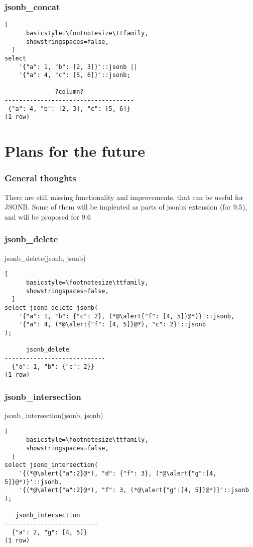 \documentclass[14pt, compress]{beamer}
\begin{document}
\begin{frame}[fragile]
\frametitle{jsonb\_concat}
  \begin{lstlisting}[
      basicstyle=\footnotesize\ttfamily,
      showstringspaces=false,
  ]
select 
    '{"a": 1, "b": [2, 3]}'::jsonb ||
    '{"a": 4, "c": [5, 6]}'::jsonb;

              ?column?              
------------------------------------
 {"a": 4, "b": [2, 3], "c": [5, 6]}
(1 row)

  \end{lstlisting}
\end{frame}

\section{Plans for the future}

\begin{frame}[fragile]
  \frametitle{General thoughts}

  There are still missing functionality and improvements, that can be useful for JSONB.
  Some of them will be implented as parts of jsonbx extension (for 9.5), and will be proposed for 9.6
\end{frame}

\begin{frame}[fragile]
  \frametitle{jsonb\_delete}
  jsonb\_delete(jsonb, jsonb)

  \begin{lstlisting}[
      basicstyle=\footnotesize\ttfamily,
      showstringspaces=false,
  ]
select jsonb_delete_jsonb(
    '{"a": 1, "b": {"c": 2}, (*@\alert{"f": [4, 5]}@*)}'::jsonb,
    '{"a": 4, (*@\alert{"f": [4, 5]}@*), "c": 2}'::jsonb
);

      jsonb_delete
----------------------------
  {"a": 1, "b": {"c": 2}}
(1 row)

  \end{lstlisting}

\end{frame}

\begin{frame}[fragile]
  \frametitle{jsonb\_intersection}
  jsonb\_intersection(jsonb, jsonb)

  \begin{lstlisting}[
      basicstyle=\footnotesize\ttfamily,
      showstringspaces=false,
  ]
select jsonb_intersection(
    '{(*@\alert{"a":2}@*), "d": {"f": 3}, (*@\alert{"g":[4, 5]}@*)}'::jsonb,
    '{(*@\alert{"a":2}@*), "f": 3, (*@\alert{"g":[4, 5]}@*)}'::jsonb
);

   jsonb_intersection
--------------------------
  {"a": 2, "g": [4, 5]}
(1 row)

  \end{lstlisting}

\end{frame}
\end{document}
